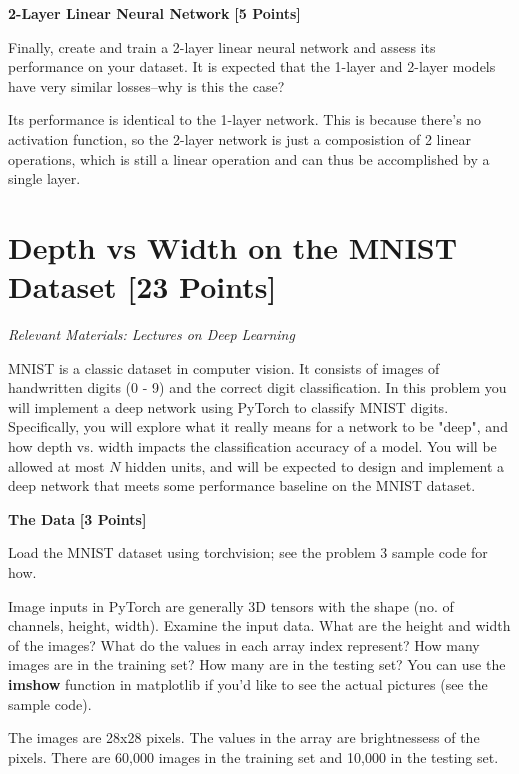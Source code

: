 \problem \textbf{2-Layer Linear Neural Network} \textbf{[5 Points]}

Finally, create and train a 2-layer linear neural network and assess its performance on your dataset. It is expected that the 1-layer and 2-layer models have very similar losses--why is this the case?

\begin{solution}
  Its performance is identical to the 1-layer network.
  This is because there's no activation function, so the 2-layer network is just a composistion of 2 linear operations, which is still a linear operation and can thus be accomplished by a single layer.
\end{solution}





\newpage
\section{Depth vs Width on the MNIST Dataset  [23 Points]}

\textit{Relevant Materials: Lectures on Deep Learning}

MNIST is a classic dataset in computer vision. It consists of images of handwritten digits (0 - 9) and the correct digit classification. In this problem you will implement a deep network using PyTorch to classify MNIST digits. Specifically, you will explore what it really means for a network to be "deep", and how depth vs. width impacts the classification accuracy of a model. You will be allowed at most $N$ hidden units, and will be expected to design and implement a deep network that meets some performance baseline on the MNIST dataset.

\medskip

\problem \textbf{The Data} \textbf{[3 Points]}

Load the MNIST dataset using torchvision; see the problem 3 sample code for how.

Image inputs in PyTorch are generally 3D tensors with the shape (no. of channels, height, width). Examine the input data. What are the height and width of the images? What do the values in each array index represent?  How many images are in the training set? How many are in the testing set? You can use the \textbf{imshow} function in matplotlib if you'd like to see the actual pictures (see the sample code).

\begin{subsolution}
  The images are 28x28 pixels.
  The values in the array are brightnessess of the pixels.
  There are 60,000 images in the training set and 10,000 in the testing set.
\end{subsolution}

